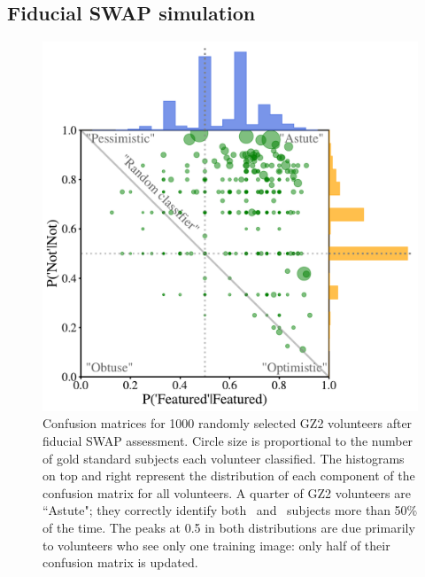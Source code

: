 \subsection{Fiducial SWAP simulation}\label{chap3: fiducial}

\begin{figure}
\centering
\includegraphics[width=5in]{Figures/human_machine/f2.pdf}
\caption[Volunteer confusion matrices achieved through SWAP reprocessing of GZ2 data.]{Confusion matrices for 1000 randomly selected GZ2 volunteers after fiducial SWAP assessment. Circle size is proportional to the number of gold standard subjects each volunteer classified. The histograms on top and right represent the distribution of each component of the confusion matrix for all volunteers.  A quarter of GZ2 volunteers are ``Astute"; they correctly identify both \feat~and \notfeat~subjects more than 50\% of the time. The peaks at 0.5 in both distributions are due primarily to volunteers who see only one training image: only half of their confusion matrix is updated.}
\label{fig: volunteer training}
\end{figure}

